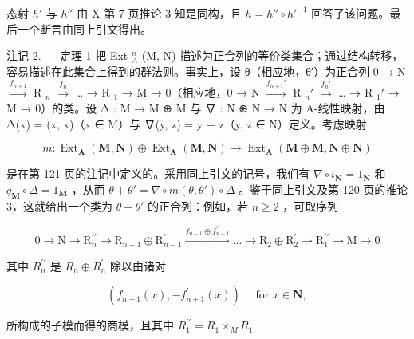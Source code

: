 态射 \(h'\) 与 \(h''\) 由 X 第 7 页推论 3 知是同构，且 \(h = h'' \circ h'^{-1}\) 回答了该问题。最后一个断言由同上引文得出。

注记 2. --- 定理 1 把 Ext \(_{A}^{n}\) (M, N) 描述为正合列的等价类集合；通过结构转移，容易描述在此集合上得到的群法则。事实上，设 θ（相应地，θ′）为正合列 0 → N \(\xrightarrow{f_{n+1}}\) R \(_{n}\) \(\xrightarrow{f_n}\) \ldots{} → R \(_{1}\) → M → 0（相应地，0 → N \(\xrightarrow{f_{n+1}'}\) R \(_{n}'\) \(\xrightarrow{f_n'}\) \ldots{} → R \(_{1}'\) → M → 0）的类。设 Δ : M → M ⊕ M 与 ∇ : N ⊕ N → N 为 A-线性映射，由 Δ(x) = (x, x)（x ∈ M）与 ∇(y, z) = y + z（y, z ∈ N）定义。考虑映射

\[
m: \operatorname{Ext} _ {\mathbf {A}} (\mathbf {M}, \mathbf {N}) \oplus \operatorname{Ext} _ {\mathbf {A}} (\mathbf {M}, \mathbf {N}) \rightarrow \operatorname{Ext} _ {\mathbf {A}} (\mathbf {M} \oplus \mathbf {M}, \mathbf {N} \oplus \mathbf {N})
\]

是在第 121 页的注记中定义的。采用同上引文的记号，我们有 \(\nabla \circ i_{\mathbf{N}} = 1_{\mathbf{N}}\) 和 \(q_{\mathbf{M}} \circ \Delta = 1_{\mathbf{M}}\) ，从而 \(\theta + \theta' = \nabla \circ m(\theta, \theta') \circ \Delta\) 。鉴于同上引文及第 120 页的推论 3，这就给出一个类为 \(\theta + \theta'\) 的正合列：例如，若 \(n \geqslant 2\) ，可取序列

\[
0 \rightarrow \mathrm{N} \rightarrow \mathrm{R} _ {n} ^ {\prime \prime} \rightarrow \mathrm{R} _ {n - 1} \oplus \mathrm{R} _ {n - 1} ^ {\prime} \xrightarrow {f _ {n - 1} \oplus f _ {n - 1} ^ {\prime}} \dots \rightarrow \mathrm{R} _ {2} \oplus \mathrm{R} _ {2} ^ {\prime} \rightarrow \mathrm{R} _ {1} ^ {\prime \prime} \rightarrow \mathrm{M} \rightarrow 0
\]

其中 \(R_{n}^{\prime\prime}\) 是 \(R_{n} \oplus R_{n}^{\prime}\) 除以由诸对

\[
\left(f _ {n + 1} (x), - f _ {n + 1} ^ {\prime} (x)\right) \quad \text { for } x \in \mathbf {N},
\]

所构成的子模而得的商模，且其中 \(R_{1}^{\prime\prime}=R_{1}\times_{M}R_{1}^{\prime}\)
\relax{}
